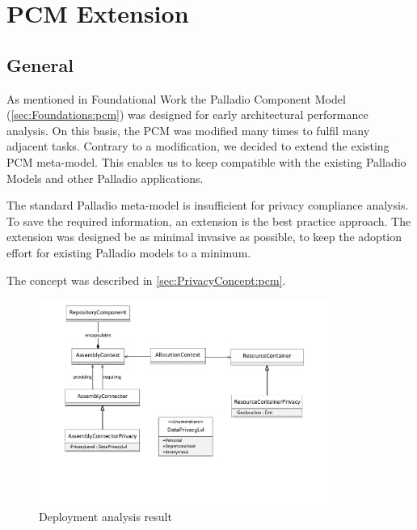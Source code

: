 
\chapter{PCM Extension}
\label{ch:pcmExtension}

\section{General}
\label{sec:pcmExtension:general}

As mentioned in Foundational Work the Palladio Component Model (\autoref{sec:Foundations:pcm}) was designed for early architectural performance analysis. On this basis, the PCM was modified many times to fulfil many adjacent tasks. Contrary to a modification, we decided to extend the existing PCM meta-model. This enables us to keep compatible with the existing Palladio Models and other Palladio applications.

The standard Palladio meta-model is insufficient for privacy compliance analysis. To save the required information, an extension is the best practice approach. The extension was designed be as minimal invasive as possible, to keep the adoption effort for existing Palladio models to a minimum.

The concept was described in \autoref{sec:PrivacyConcept:pcm}.

\begin{figure}[h]
	\centering
	\includegraphics[trim = 20mm 50mm 20mm 05mm, clip, width=0.85\textwidth]{graphs/pcm_privacy_meta}
	\caption{Deployment analysis result}
	\label{fig:pcmExtension:meta}
\end{figure}


